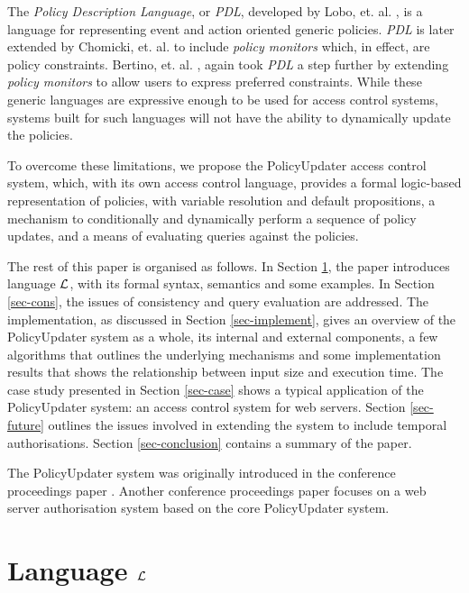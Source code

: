 \documentclass[global,twocolumn,final]{svjour}
\begin{document}
    The {\em Policy Description Language}, or {\em PDL}, developed by Lobo,
    et. al. \cite{LOB}, is a language for representing event and action
    oriented generic policies. {\em PDL} is later extended by Chomicki, et. al.
    \cite{CHO} to include {\em policy monitors} which, in effect, are policy
    constraints. Bertino, et. al. \cite{BE2}, again took {\em PDL} a step
    further by extending {\em policy monitors} to allow users to express
    preferred constraints. While these generic languages are expressive enough
    to be used for access control systems, systems built for such languages
    will not have the ability to dynamically update the policies.

    To overcome these limitations, we propose the PolicyUpdater access control
    system, which, with its own access control language, provides a formal
    logic-based representation of policies, with variable resolution and
    default propositions, a mechanism to conditionally and dynamically
    perform a sequence of policy updates, and a means of evaluating queries
    against the policies.

     The rest of this paper is organised as follows. In Section \ref{sec-langl},
    the paper introduces language ${\cal L}$, with its formal syntax, semantics
    and some examples. In Section \ref{sec-cons}, the issues of consistency and
    query evaluation are addressed. The implementation, as discussed in Section
    \ref{sec-implement}, gives an overview of the PolicyUpdater system as
    a whole, its internal and external components, a few algorithms that
    outlines the underlying mechanisms and some implementation results that
    shows the relationship between input size and execution time. The case
    study presented in Section \ref{sec-case} shows a typical application of
    the PolicyUpdater system: an access control system for web servers. Section
    \ref{sec-future} outlines the issues involved in extending the system to
    include temporal authorisations. Section \ref{sec-conclusion} contains a
    summary of the paper.

    The PolicyUpdater system was originally introduced in the conference
    proceedings paper \cite{CR1}. Another conference proceedings paper
    \cite{CR2} focuses on a web server authorisation system based on the
    core PolicyUpdater system.

  \section{Language $\cal{L}$}
    \label{sec-langl}
\end{document}
